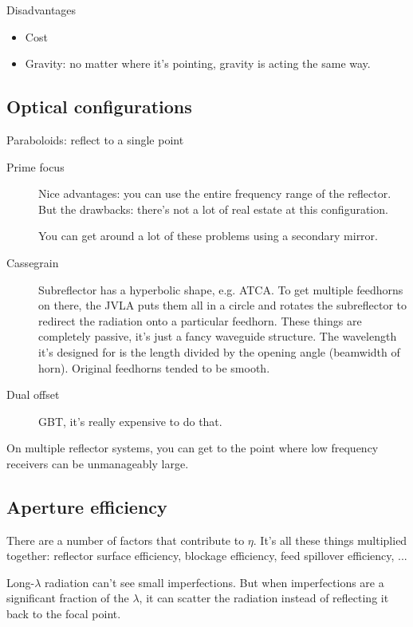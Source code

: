 \documentclass[a4paper]{article}
\begin{document}
Disadvantages
\begin{itemize}
\item Cost
\item Gravity: no matter where it's pointing, gravity is acting the same way. 
\end{itemize}

\subsection{Optical configurations}

Paraboloids: reflect to a single point

\begin{description}

\item[Prime focus] Nice advantages: you can use the entire frequency range of the reflector. But the drawbacks: there's not a lot of real estate at this configuration. 

You can get around a lot of these problems using a secondary mirror. 

\item[Cassegrain] Subreflector has a hyperbolic shape, e.g. ATCA. To get multiple feedhorns on there, the JVLA puts them all in a circle and rotates the subreflector to redirect the radiation onto a particular feedhorn. These things are completely passive, it's just a fancy waveguide structure. The wavelength it's designed for is the length divided by the opening angle (beamwidth of horn). Original feedhorns tended to be smooth.

\item[Dual offset] GBT, it's really expensive to do that. 

\end{description}

On multiple reflector systems, you can get to the point where low frequency receivers can be unmanageably large. 

\subsection{Aperture efficiency}

There are a number of factors that contribute to $\eta$. It's all these things multiplied together: reflector surface efficiency, blockage efficiency, feed spillover efficiency, ...

Long-$\lambda$ radiation can't see small imperfections. But when imperfections are a significant fraction of the $\lambda$, it can scatter the radiation instead of reflecting it back to the focal point. 
\end{document}
